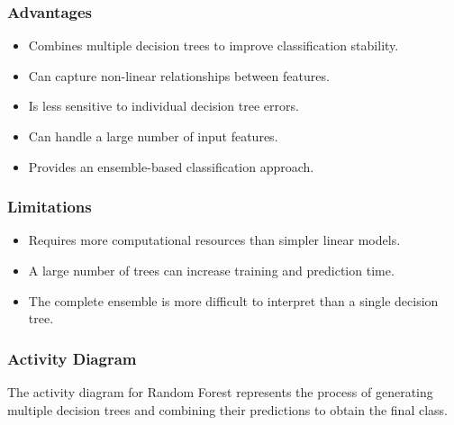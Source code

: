 \documentclass[12pt,a4paper]{report}
\begin{document}
\subsubsection*{Advantages}

\begin{itemize}
    \item Combines multiple decision trees to improve classification stability.
    \item Can capture non-linear relationships between features.
    \item Is less sensitive to individual decision tree errors.
    \item Can handle a large number of input features.
    \item Provides an ensemble-based classification approach.
\end{itemize}

\subsubsection*{Limitations}

\begin{itemize}
    \item Requires more computational resources than simpler linear models.
    \item A large number of trees can increase training and prediction time.
    \item The complete ensemble is more difficult to interpret than a single decision tree.
\end{itemize}

\subsubsection*{Activity Diagram}

The activity diagram for Random Forest represents the process of generating multiple decision trees and combining their predictions to obtain the final class.
\end{document}
